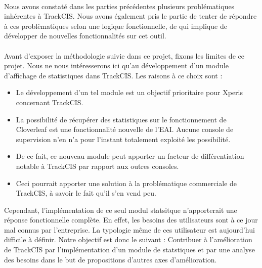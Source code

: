 			\paragraph{}%
			Nous avons constaté dans les parties précédentes plusieurs problématiques
			inhérentes à TrackCIS. Nous avons également pris le partie de tenter de
			répondre à ces problèmatiques selon une logique fonctionnelle, de qui
			implique de développer de nouvelles fonctionnalités sur cet outil.
			
			
			\paragraph{}%
			Avant d'exposer la méthodologie suivie dans ce projet, fixons les limites de
			ce projet. Nous ne nous intéresserons ici qu'au développement d'un
			module d'affichage de statistiques dans TrackCIS. Les raisons à ce choix sont
			:
			\begin{itemize}
			  \item Le développement d'un tel module est un objectif prioritaire pour
			  Xperis concernant TrackCIS.
			  \item La possibilité de récupérer des statistiques sur le fonctionnement de
			  Cloverleaf est une fonctionnalité nouvelle de l'EAI. Aucune console de
			  supervision n'en n'a pour l'instant totalement exploité les possibilité.
			  \item De ce fait, ce nouveau module peut apporter un facteur de
			  différentiation notable à TrackCIS par rapport aux outres consoles.
			  \item Ceci pourrait apporter une solution à la problématique commerciale
			  de TrackCIS, à savoir le fait qu'il s'en vend peu.
			\end{itemize}
			Cependant, l'implémentation de ce seul modul statsitque n'apporterait une
			réponse fonctionnelle complète. En effet, les besoins des utilisateurs sont à
			ce jour mal connus par l'entreprise. La typologie même de ces utilisateur est
			aujourd'hui difficile à définir.\newline
			Notre objectif est donc le suivant :\newline
			Contribuer à l'amélioration de TrackCIS par l'implémentation d'un module de
			statstiques et par une analyse des besoins dans le but de propositions
			d'autres axes d'amélioration.

